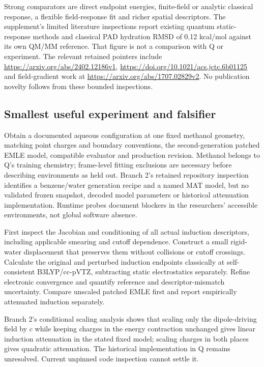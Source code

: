 \documentclass{article}
\begin{document}
Strong comparators are direct endpoint energies, finite-field or analytic classical response, a flexible field-response fit and richer spatial descriptors. The supplement's limited literature inspections report existing quantum static-response methods and classical PAD hydration RMSD of 0.12 kcal/mol against its own QM/MM reference. That figure is not a comparison with Q or experiment. The relevant retained pointers include \url{https://arxiv.org/abs/2402.12186v1}, \url{https://doi.org/10.1021/acs.jctc.6b01125} and field-gradient work at \url{https://arxiv.org/abs/1707.02829v2}. No publication novelty follows from these bounded inspections.

\subsection{Smallest useful experiment and falsifier}

Obtain a documented aqueous configuration at one fixed methanol geometry, matching point charges and boundary conventions, the second-generation patched EMLE model, compatible evaluator and production revision. Methanol belongs to Q's training chemistry; frame-level fitting exclusions are necessary before describing environments as held out. Branch 2's retained repository inspection identifies a benzene/water generation recipe and a named MAT model, but no validated frozen snapshot, decoded model parameters or historical attenuation implementation. Runtime probes document blockers in the researchers' accessible environments, not global software absence.

First inspect the Jacobian and conditioning of all actual induction descriptors, including applicable smearing and cutoff dependence. Construct a small rigid-water displacement that preserves them without collisions or cutoff crossings. Calculate the original and perturbed induction endpoints classically at self-consistent B3LYP/cc-pVTZ, subtracting static electrostatics separately. Refine electronic convergence and quantify reference and descriptor-mismatch uncertainty. Compare unscaled patched EMLE first and report empirically attenuated induction separately.

Branch 2's conditional scaling analysis shows that scaling only the dipole-driving field by $c$ while keeping charges in the energy contraction unchanged gives linear induction attenuation in the stated fixed model; scaling charges in both places gives quadratic attenuation. The historical implementation in Q remains unresolved. Current unpinned code inspection cannot settle it.
\end{document}
